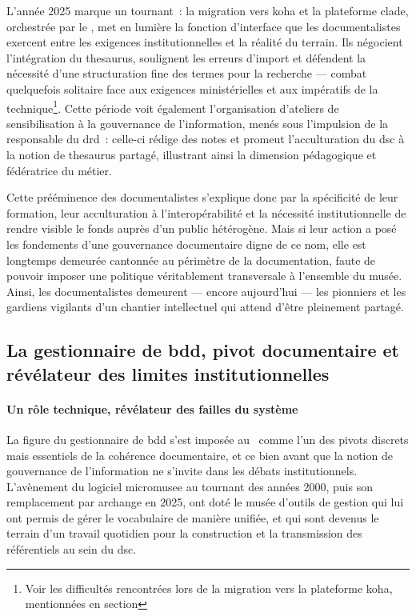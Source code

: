 L’année 2025 marque un tournant~: la migration vers \gls{koha} et la plateforme \gls{clade}, orchestrée par le \minarm, met en lumière la fonction d’interface que les documentalistes exercent entre les exigences institutionnelles et la réalité du terrain. Ils négocient l’intégration du \gls{thesaurus}, soulignent les erreurs d’import et défendent la nécessité d’une structuration fine des termes pour la recherche — combat quelquefois solitaire face aux exigences ministérielles et aux impératifs de la technique\footnote{Voir les difficultés rencontrées lors de la migration vers la plateforme \gls{koha}, mentionnées en section }. Cette période voit également l’organisation d’ateliers de sensibilisation à la gouvernance de l'information, menés sous l’impulsion de la responsable du \ac{drd}~: celle-ci rédige des notes et promeut l’acculturation du \ac{dsc} à la notion de \gls{thesaurus} partagé, illustrant ainsi la dimension pédagogique et fédératrice du métier.



Cette prééminence des documentalistes s’explique donc par la spécificité de leur formation, leur acculturation à l’interopérabilité et la nécessité institutionnelle de rendre visible le fonds auprès d’un public hétérogène. Mais si leur action a posé les fondements d’une gouvernance documentaire digne de ce nom, elle est longtemps demeurée cantonnée au périmètre de la documentation, faute de pouvoir imposer une politique véritablement transversale à l’ensemble du musée. Ainsi, les documentalistes demeurent — encore aujourd’hui — les pionniers et les gardiens vigilants d’un chantier intellectuel qui attend d’être pleinement partagé.



\subsection{La gestionnaire de \gls{bdd}, pivot documentaire et révélateur des limites institutionnelles}



\paragraph*{Un rôle technique, révélateur des failles du système}

La figure du gestionnaire de \gls{bdd} s’est imposée au \mae~comme l’un des pivots discrets mais essentiels de la cohérence documentaire, et ce bien avant que la notion de gouvernance de l’information ne s’invite dans les débats institutionnels. L’avènement du logiciel \gls{micromusee} au tournant des années 2000, puis son remplacement par \gls{archange} en 2025, ont doté le musée d’outils de gestion qui lui ont permis de gérer le vocabulaire de manière unifiée, et qui sont devenus le terrain d’un travail quotidien pour la construction et la transmission des référentiels au sein du \ac{dsc}.



